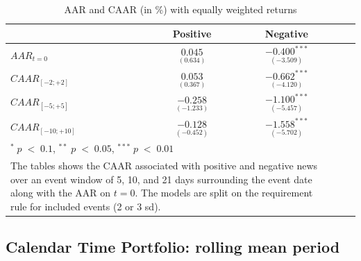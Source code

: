 \begin{table}[ht]
\centering
\caption{AAR and CAAR (in \%) with equally weighted returns} 
\begin{tabular}{lcccc}
  \hline  \hline
  & \multicolumn{1}{c}{Positive} &  \multicolumn{1}{c}{Negative}\\  
 \hline
$AAR_{t=0}$ &  $\underset{(0.634)}{0.045}$ & $\underset{(-3.509)}{-0.400^{***}}$ \\ 
$CAAR_{[-2;+2]}$  & $\underset{(0.367)}{0.053}$ & $\underset{(-4.120)}{-0.662^{***}}$ \\ 
$CAAR_{[-5;+5]}$  & $\underset{(-1.233)}{-0.258}$ & $\underset{(-5.457)}{-1.100^{***}}$ \\ 
$CAAR_{[-10;+10]}$    & $\underset{(-0.452)}{-0.128 }$ & $\underset{(-5.702)}{-1.558^{***}}$ \\ 
   \hline \hline
   \multicolumn{3}{p{10cm}}{ \footnotesize $^* \; p\; <\; 0.1$, $ ^{**} \; p\; <\; 0.05$, $ ^{***} \; p\; <\; 0.01$  } \\
   \multicolumn{3}{p{10cm}}{\footnotesize The tables shows the CAAR associated with positive and negative news over an event window of 5, 10, and 21 days surrounding the event date along with the AAR on $t=0$. The models are split on the requirement rule for included events (2 or 3 sd).} \\
   \hline
\end{tabular}
\label{tab:ST_sensitivity_weights}
\end{table}





\subsection{Calendar Time Portfolio: rolling mean period}


